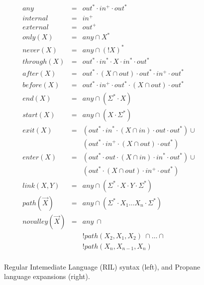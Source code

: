 \begin{figure}
\begin{minipage}[t]{.45\linewidth}
  \end{minipage}
  ~~
  \vrule
  ~~
  \begin{minipage}[t]{.5\linewidth}
  \vspace*{-1\baselineskip}
  \[ \begin{array}{rcl}
    \hline
    any           & = & out^* \cdot in^+ \cdot out^* \\
    internal      & = & in^+ \\
    external      & = & out^+ \\
    only(X)       & = & any \cap X^* \\
    never(X)      & = & any \cap (!X)^* \\
    through(X)    & = & out^* \cdot in^* \cdot X \cdot in^* \cdot out^* \\
    after(X)      & = & out^* \cdot (X \cap out) \cdot out^* \cdot in^+ \cdot out^* \\
    before(X)     & = & out^* \cdot in^+ \cdot out^* \cdot (X \cap out) \cdot out^* \\
    end(X)        & = & any \cap (\Sigma^* \cdot X) \\
    start(X)      & = & any \cap (X \cdot \Sigma^*) \\
    exit(X)       & = & (out^* \cdot in^* \cdot (X \cap in) \cdot out \cdot out^*) \cup \\
                  &        & (out^* \cdot in^+ \cdot (X \cap out) \cdot out^*) \\
    enter(X)      & = & (out^* \cdot out \cdot (X \cap in) \cdot in^* \cdot out^*) \cup \\
                  &        & (out^* \cdot (X \cap out) \cdot in^+ \cdot out^*) \\
    link(X,Y)     & = & any \cap (\Sigma^* \cdot X \cdot Y \cdot \Sigma^*) \\
    path(\vec{X}) & = & any \cap (\Sigma^* \cdot X_1 \dots X_n \cdot \Sigma^*) \\
    novalley(\vec{X}) & = & any ~ \cap \\
                  &   & !path(X_2,X_1,X_2) ~ \cap \dots \cap \\ 
                  &   & !path(X_n,X_{n-1},X_n) \\
  \end{array} \]

  \end{minipage}

  \hrulefill

  \caption{Regular Intemediate Language (RIL) syntax (left), and 
           Propane language expansions (right).}
  \label{fig:rir-syntax}
\end{figure}


